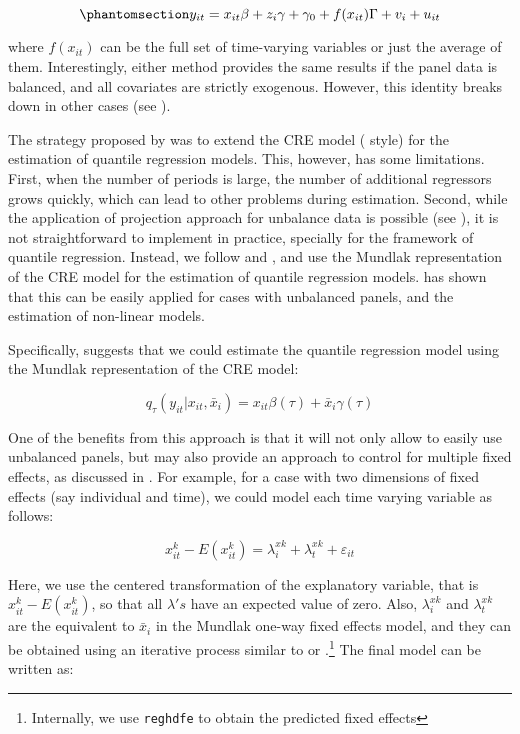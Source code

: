 \documentclass[bib]{statapress}
\begin{document}
\begin{equation}\phantomsection\label{eq-cre-final}{y_{it} = x_{it}\beta + z_{i}\gamma + \gamma_0 + f(x_{it})\Gamma + v_i + u_{it}
}\end{equation}

where \(f(x_{it})\) can be the full set of time-varying variables or
just the average of them. Interestingly, either method provides the same
results if the panel data is balanced, and all covariates are strictly
exogenous. However, this identity breaks down in other cases (see
\citet{abrevaya2013}).

The strategy proposed by \citet{abrevaya2008} was to extend the CRE
model (\citet{chamberlain1982} style) for the estimation of quantile
regression models. This, however, has some limitations. First, when the
number of periods is large, the number of additional regressors grows
quickly, which can lead to other problems during estimation. Second,
while the application of \citet{chamberlain1982} projection approach for
unbalance data is possible (see \citet{abrevaya2013}), it is not
straightforward to implement in practice, specially for the framework of
quantile regression. Instead, we follow \citet{wooldridge2010} and
\citet{wooldridge2019}, and use the Mundlak representation of the CRE
model for the estimation of quantile regression models.
\citet{wooldridge2019} has shown that this can be easily applied for
cases with unbalanced panels, and the estimation of non-linear models.

Specifically, \citet{wooldridge2010} suggests that we could estimate the
quantile regression model using the Mundlak representation of the CRE
model:

\[q_\tau(y_{it}|x_{it},\bar x_i)=x_{it}\beta(\tau)+\bar x_i\gamma(\tau) 
\]

One of the benefits from this approach is that it will not only allow to
easily use unbalanced panels, but may also provide an approach to
control for multiple fixed effects, as discussed in \citet{baltagi2023}.
For example, for a case with two dimensions of fixed effects (say
individual and time), we could model each time varying variable as
follows:

\[x^k_{it}-E(x_{it}^k)=\lambda^{xk}_i + \lambda^{xk}_t + \varepsilon_{it}
\]

Here, we use the centered transformation of the explanatory variable,
that is \(x^k_{it}-E(x_{it}^k)\), so that all \(\lambda's\) have an
expected value of zero. Also, \(\lambda^{xk}_i\) and \(\lambda^{xk}_t\)
are the equivalent to \(\bar x_i\) in the Mundlak one-way fixed effects
model, and they can be obtained using an iterative process similar to
\citet{rios2015} or \citet{correia_feasible_nodate}.\footnote{Internally,
  we use \citet{correia_feasible_nodate} \texttt{reghdfe} to obtain the
  predicted fixed effects} The final model can be written as:
\end{document}
